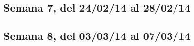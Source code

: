 \documentclass[11pt,oneside,titlepage]{article}
\begin{document}
\subsection*{Semana 7, del 24/02/14 al 28/02/14}
\begin{comment}

lunes
- Se decide por comprar la tarjeta desarrollo USB33880 , Claudio Torres no
escucha nuestras advertencias de que hay que realiar el driver completamente y
aún asi decide comprarla. Francisco nos pide que le mandemos el valor para que
la Universidad realice la compra, el producto no es disponible. Mantemos al
tanto a Torres sobre el problema, no sabemos que hacer.  Por mientras cada uno
hace lo suyo.

martes
- Se envía correo preguntado por el stock, efectivamente hay y los problemas son de la página web. La respuesta fue que intentaramos de nuevo y si teníamos problemas que avisaramos. La página tiene problemas y ya dimos el aviso, estamos a la espera.

miercoles
-
\end{comment}

\subsection*{Semana 8, del 03/03/14 al 07/03/14}
\end{document}
